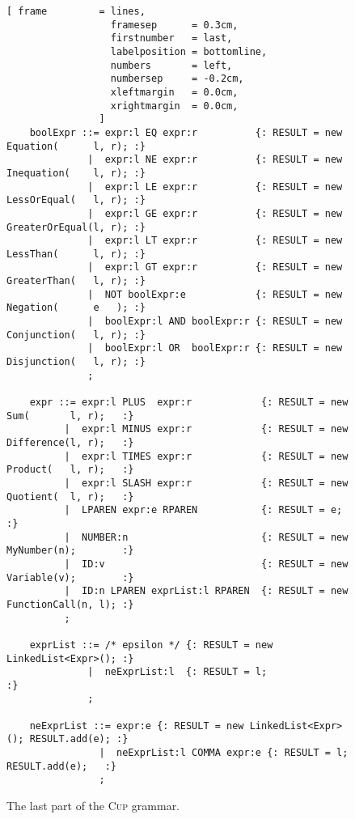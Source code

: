 \begin{figure}[!ht]
\centering
\begin{Verbatim}[ frame         = lines, 
                  framesep      = 0.3cm, 
                  firstnumber   = last,
                  labelposition = bottomline,
                  numbers       = left,
                  numbersep     = -0.2cm,
                  xleftmargin   = 0.0cm,
                  xrightmargin  = 0.0cm,
                ]
    boolExpr ::= expr:l EQ expr:r          {: RESULT = new Equation(      l, r); :}
              |  expr:l NE expr:r          {: RESULT = new Inequation(    l, r); :}
              |  expr:l LE expr:r          {: RESULT = new LessOrEqual(   l, r); :}
              |  expr:l GE expr:r          {: RESULT = new GreaterOrEqual(l, r); :}
              |  expr:l LT expr:r          {: RESULT = new LessThan(      l, r); :}
              |  expr:l GT expr:r          {: RESULT = new GreaterThan(   l, r); :}
              |  NOT boolExpr:e            {: RESULT = new Negation(      e   ); :}
              |  boolExpr:l AND boolExpr:r {: RESULT = new Conjunction(   l, r); :}
              |  boolExpr:l OR  boolExpr:r {: RESULT = new Disjunction(   l, r); :}
              ;
    
    expr ::= expr:l PLUS  expr:r            {: RESULT = new Sum(       l, r);   :}
          |  expr:l MINUS expr:r            {: RESULT = new Difference(l, r);   :}
          |  expr:l TIMES expr:r            {: RESULT = new Product(   l, r);   :}
          |  expr:l SLASH expr:r            {: RESULT = new Quotient(  l, r);   :}
          |  LPAREN expr:e RPAREN           {: RESULT = e;                      :}
          |  NUMBER:n                       {: RESULT = new MyNumber(n);        :}
          |  ID:v                           {: RESULT = new Variable(v);        :}
          |  ID:n LPAREN exprList:l RPAREN  {: RESULT = new FunctionCall(n, l); :}
          ;
    
    exprList ::= /* epsilon */ {: RESULT = new LinkedList<Expr>(); :}
              |  neExprList:l  {: RESULT = l;                      :}
              ;
    
    neExprList ::= expr:e {: RESULT = new LinkedList<Expr>(); RESULT.add(e); :}                  
                |  neExprList:l COMMA expr:e {: RESULT = l; RESULT.add(e);   :}
                ;
\end{Verbatim}
\vspace*{-0.3cm}
\caption{The last part of the \textsc{Cup} grammar.}
\label{fig:compiler.cup-3}
\end{figure}



